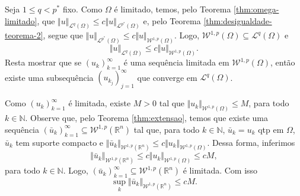 \documentclass[a4paper, 11pt]{book}
\theoremstyle{definition}
\newcommand{\bN}{\mathbb{N}}
\newcommand{\bR}{\mathbb{R}}
\newcommand{\cL}{\mathcal{L}}
\newcommand{\cW}{\mathcal{W}}
\begin{document}
\begin{prf}
    Seja $1 \leqslant q < p^*$ fixo.
    Como $\Omega$ é limitado, temos, pelo Teorema \ref{thm:omega-limitado}, que $\Vert u \Vert_{\cL^q(\Omega)} \leqslant c \Vert u \Vert_{\cL^{p^*}(\Omega)}$
    e, pelo Teorema \ref{thm:desigualdade-teorema-2}, segue que
    $\Vert u \Vert_{\cL^{p^*}(\Omega)} \leqslant c \Vert u \Vert_{\cW^{1,p}(\Omega)}$.
    Logo, $\cW^{1,p}(\Omega) \subseteq \cL^q(\Omega)$ e
    \[
        \Vert u \Vert_{\cL^q(\Omega)} \leqslant c \Vert u \Vert_{\cW^{1,p}(\Omega)}.
    \]
    Resta mostrar que se $(u_k)_{k=1}^\infty$ é uma sequência limitada em $\cW^{1,p}(\Omega)$, então existe uma subsequência $(u_{k_j})_{j=1}^\infty$ que converge em $\cL^q(\Omega)$.
    
    Como $(u_k)_{k=1}^\infty$ é limitada, existe $M > 0$ tal que $\Vert u_k \Vert_{\cW^{1,p}(\Omega)} \leqslant M$, para todo $k \in \bN$.
    Observe que, pelo Teorema \ref{thm:extensao}, temos que existe uma sequência $(\bar u_k)_{k=1}^\infty \subseteq \cW^{1,p}(\bR^n)$ tal que, para todo $k \in \bN$, $\bar u_k = u_k$ qtp em $\Omega$, $\bar u_k$ tem suporte compacto e $\Vert \bar u_k \Vert_{\cW^{1,p}(\bR^n)} \leqslant c \Vert u_k \Vert_{\cW^{1,p}(\Omega)}$.
    Dessa forma, inferimos
    \[
        \Vert \bar u_k \Vert_{\cW^{1,p}(\bR^n)} \leqslant c \Vert u_k \Vert_{\cW^{1,p}(\Omega)} \leqslant cM,
    \]
    para todo $k \in \bN$.
    Logo, $(\bar u_k)_{k=1}^\infty \subseteq \cW^{1,p}(\bR^n)$ é limitada.
    Com isso
    \begin{equation} \label{eq:supfinito}
        \sup_{k} \Vert \bar u_k \Vert_{\cW^{1,p}(\bR^n)} \leqslant cM.
    \end{equation}


\end{prf}
\end{document}
